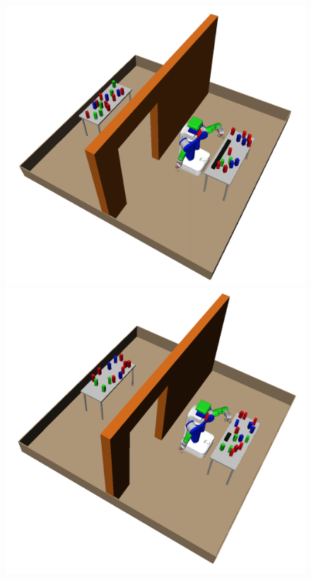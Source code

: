 \begin{figure}[htb]
\centering
\includegraphics[scale=0.18]{./figures/biggest1}
\includegraphics[scale=0.18]{./figures/biggest2}

\end{figure}
